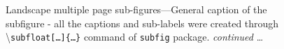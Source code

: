 \documentclass[phd]{ndsu-thesis-2022}
\newcommand\cmd[1]{\textbackslash\texttt{#1}}  %
\begin{document}
\begin{landscape}
\begin{figure}[p]
\\
\hspace{0.5in}
\hspace{0.5in}
\hspace{0.5in}
\hspace{0.5in}
\\
\captionsetup{singlelinecheck=false} %
\caption{Landscape multiple page sub-figures---General caption of the subfigure - all the captions and sub-labels were created through \cmd{subfloat[\ldots]\{\ldots\}} command of \texttt{subfig} package. \emph{continued} \ldots} \label{fig:1gen1}
\end{figure}
\clearpage


\end{landscape}
\end{document}
